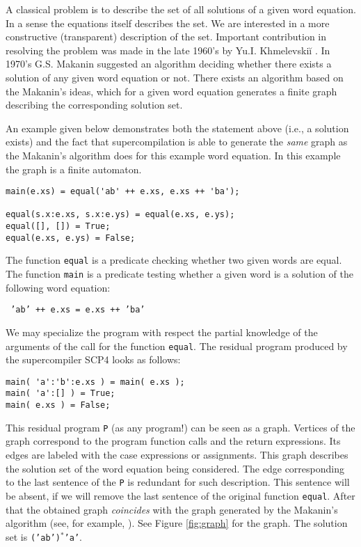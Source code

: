 \documentclass[preprint]{sigplanconf}
\begin{document}
A classical problem is to describe the set of all solutions of a given word equation. In a sense the equations itself describes the set. We are interested in a more constructive (transparent) description of the set.  
Important contribution in resolving the problem was made in the late 1960's by Yu.I. Khmelevski\u{i} \cite{Khmelevskii:77}.  In 1970's G.S. Makanin \cite{Makanin:77} suggested an algorithm deciding whether there exists a solution of any given word equation or not. There exists an algorithm based on the Makanin's ideas, which for a given word equation generates a finite graph describing the corresponding solution set. 

An example given below demonstrates both the statement above 
(i.e., a solution exists)
and the fact that supercompilation is able to generate the \emph{same} graph as the Makanin's algorithm does for this example word equation. 
In this example the graph is a finite automaton. 

\noindent
\begin{verbatim}
main(e.xs) = equal('ab' ++ e.xs, e.xs ++ 'ba');

equal(s.x:e.xs, s.x:e.ys) = equal(e.xs, e.ys);
equal([], []) = True;
equal(e.xs, e.ys) = False;
\end{verbatim}

The function \texttt{equal} is a predicate checking  whether two given words are equal.  The function \texttt{main} is a predicate testing whether a given word is a solution of the following word equation:


\begin{center}
\texttt{
'ab' ++ e.xs = e.xs ++ 'ba'
}
\end{center}

We may specialize the program with respect the partial knowledge of the arguments of the call for the function \texttt{equal}. The residual program produced by the supercompiler SCP4 looks as follows:

\noindent
\begin{verbatim}
main( 'a':'b':e.xs ) = main( e.xs );
main( 'a':[] ) = True;
main( e.xs ) = False;
\end{verbatim}

This residual program \texttt{P} (as any program!) can be seen as a graph. 
Vertices of the graph correspond to the program function calls and the return expressions. Its edges are labeled with the case expressions or assignments. This graph describes the solution set of the word equation being considered. The edge corresponding to the last sentence of the \texttt{P} is redundant for such description. This sentence will be absent, if we will remove the last sentence of the original function \texttt{equal}. After that the obtained graph \emph{coincides} with the graph generated by the Makanin's algorithm (see, for example, \cite{Diekert02}). See Figure \ref{fig:graph} for the graph. The solution set is \texttt{('ab')$^*$'a'}.
\end{document}
